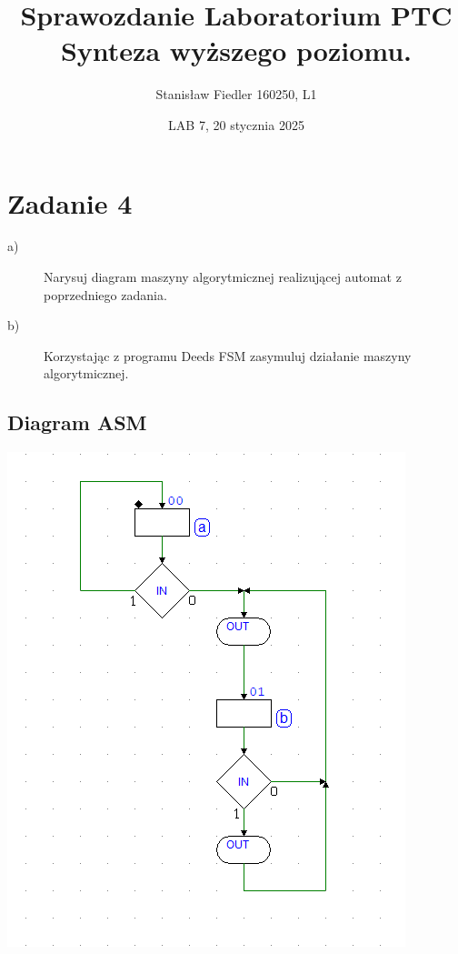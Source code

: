 \documentclass[a4paper, 11pt]{article}
\title{%
        \vspace{-2cm}
       \large Sprawozdanie Laboratorium PTC \\
       \huge Synteza wyższego poziomu.}
\author{Stanisław Fiedler 160250, L1}
\date{LAB 7, 20 stycznia 2025}
\begin{document}
\maketitle

\section{Zadanie 4}\label{sec:zadanie_} %

\begin{description}
	\item[a)] Narysuj diagram maszyny algorytmicznej realizującej automat z poprzedniego zadania.
	\item[b)] Korzystając z programu Deeds FSM zasymuluj działanie maszyny algorytmicznej.
\end{description}

\subsection{Diagram ASM}\label{sub:diagram_asm} %
\begin{center}
	\includegraphics[scale=0.6]{images/asm_4.png}
\end{center}
\end{document}
